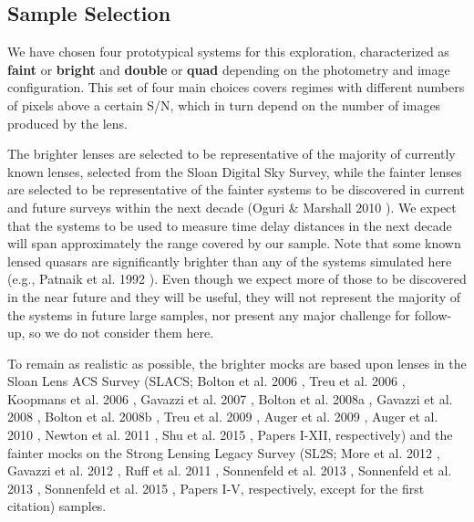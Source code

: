 \documentclass[a4paper,11pt]{article}
\begin{document}
\subsection{Sample Selection}

We have chosen four prototypical systems for this exploration,
characterized as \textbf{faint} or \textbf{bright} and \textbf{double}
or \textbf{quad} depending on the photometry and image
configuration. This set of four main choices covers regimes with
different numbers of pixels above a certain S/N, which in turn depend
on the number of images produced by the lens.


The brighter lenses are selected to be representative of the majority
of currently known lenses, selected from the Sloan Digital Sky Survey,
while the fainter lenses are selected to be representative of the
fainter systems to be discovered in current and future surveys within
the next decade (Oguri \& Marshall 2010
\cite{2010MNRAS.405.2579O}). We expect that the systems to be used to
measure time delay distances in the next decade will span
approximately the range covered by our sample. Note that some known
lensed quasars are significantly brighter than any of the systems
simulated here (e.g., Patnaik et al. 1992 \cite{1992MNRAS.259P...1P}). Even though we
expect more of those to be discovered in the near future and they will
be useful, they will not represent the majority of the systems in
future large samples, nor present any major challenge for follow-up,
so we do not consider them here.

To remain as realistic as possible, the brighter mocks are based upon
lenses in the Sloan Lens ACS Survey (SLACS; Bolton et al. 2006
\cite{2006ApJ...638..703B}, Treu et al. 2006
\cite{2006ApJ...640..662T}, Koopmans et al. 2006
\cite{2006ApJ...649..599K}, Gavazzi et al. 2007
\cite{2007ApJ...667..176G}, Bolton et al. 2008a
\cite{2008ApJ...682..964B}, Gavazzi et al. 2008
\cite{2008ApJ...677.1046G}, Bolton et al. 2008b
\cite{2008ApJ...684..248B}, Treu et al. 2009
\cite{2009ApJ...690..670T}, Auger et al. 2009
\cite{2009ApJ...705.1099A}, Auger et al. 2010
\cite{2010ApJ...724..511A}, Newton et al. 2011
\cite{2011ApJ...734..104N}, Shu et al. 2015
\cite{2014arXiv1407.2240S}, Papers I-XII, respectively) and the fainter mocks on the Strong
Lensing Legacy Survey (SL2S; More et al. 2012
\cite{2012ApJ...749...38M}, Gavazzi et al. 2012 \cite{2012ApJ...761..170G},
Ruff et al. 2011 \cite{2011ApJ...727...96R}, Sonnenfeld et al. 2013
\cite{2013ApJ...777...97S}, Sonnenfeld et al. 2013
\cite{2013ApJ...777...98S}, Sonnenfeld et al. 2015
\cite{2015ApJ...800...94S}, Papers I-V, respectively, except for the
first citation) samples.
\end{document}
